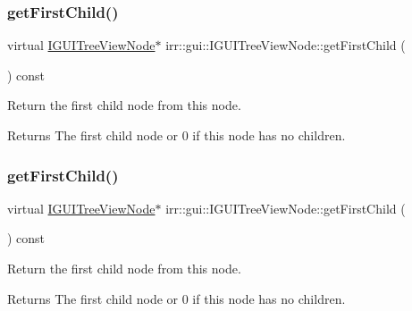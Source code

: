 \subsubsection{\texorpdfstring{get\+First\+Child()}{getFirstChild()}\hspace{0.1cm}{\footnotesize\ttfamily [1/2]}}
{\footnotesize\ttfamily virtual \hyperlink{classirr_1_1gui_1_1IGUITreeViewNode}{I\+G\+U\+I\+Tree\+View\+Node}$\ast$ irr\+::gui\+::\+I\+G\+U\+I\+Tree\+View\+Node\+::get\+First\+Child (\begin{DoxyParamCaption}{ }\end{DoxyParamCaption}) const\hspace{0.3cm}{\ttfamily [pure virtual]}}



Return the first child node from this node. 

\begin{DoxyReturn}{Returns}
The first child node or 0 if this node has no children. 
\end{DoxyReturn}
\mbox{\label{classirr_1_1gui_1_1IGUITreeViewNode_a33cbd8c146ec27a4812548a32d81732b}} 
\subsubsection{\texorpdfstring{get\+First\+Child()}{getFirstChild()}\hspace{0.1cm}{\footnotesize\ttfamily [2/2]}}
{\footnotesize\ttfamily virtual \hyperlink{classirr_1_1gui_1_1IGUITreeViewNode}{I\+G\+U\+I\+Tree\+View\+Node}$\ast$ irr\+::gui\+::\+I\+G\+U\+I\+Tree\+View\+Node\+::get\+First\+Child (\begin{DoxyParamCaption}{ }\end{DoxyParamCaption}) const\hspace{0.3cm}{\ttfamily [pure virtual]}}



Return the first child node from this node. 

\begin{DoxyReturn}{Returns}
The first child node or 0 if this node has no children. 
\end{DoxyReturn}
\mbox{\label{classirr_1_1gui_1_1IGUITreeViewNode_ad9f08dced84c88360485988af188e296}} 
